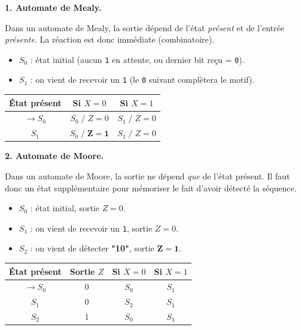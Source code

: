 \documentclass[a4paper,11pt]{article}
\newif\ifsolutions
\begin{document}
\ifsolutions
\begin{solbox}

\textbf{1. Automate de Mealy.}

Dans un automate de Mealy, la sortie dépend de l'état \emph{présent} et de l'entrée \emph{présente}. La réaction est donc immédiate (combinatoire).

\begin{itemize}
    \item $S_0$ : état initial (aucun \texttt{1} en attente, ou dernier bit reçu = \texttt{0}).
    \item $S_1$ : on vient de recevoir un \texttt{1} (le \texttt{0} suivant complètera le motif).
\end{itemize}

\medskip
\noindent
\begin{tabular}{|c|c|c|}
\hline
\textbf{État présent} & \textbf{Si $X = 0$} & \textbf{Si $X = 1$} \\
\hline
$\rightarrow S_0$ & $S_0 \;/\; Z=0$ & $S_1 \;/\; Z=0$ \\
\hline
$S_1$             & $S_0 \;/\; \mathbf{Z=1}$ & $S_1 \;/\; Z=0$ \\
\hline
\end{tabular}

\medskip
\textbf{2. Automate de Moore.}

Dans un automate de Moore, la sortie ne dépend \emph{que} de l'état présent. Il faut donc un état supplémentaire pour \og mémoriser \fg{} le fait d'avoir détecté la séquence.

\begin{itemize}
    \item $S_0$ : état initial, sortie $Z=0$.
    \item $S_1$ : on vient de recevoir un \texttt{1}, sortie $Z=0$.
    \item $S_2$ : on vient de détecter \textbf{"10"}, sortie $\mathbf{Z=1}$.
\end{itemize}

\medskip
\noindent
\begin{tabular}{|c|c|c|c|}
\hline
\textbf{État présent} & \textbf{Sortie $Z$} & \textbf{Si $X = 0$} & \textbf{Si $X = 1$} \\
\hline
$\rightarrow S_0$ & 0 & $S_0$ & $S_1$ \\
\hline
$S_1$             & 0 & $S_2$ & $S_1$ \\
\hline
$S_2$             & 1 & $S_0$ & $S_1$ \\
\hline
\end{tabular}


\end{solbox}
\end{document}
